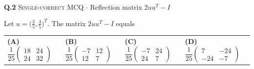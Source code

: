 \documentclass[11pt,a4paper]{article}
\newcommand{\optlabel}[1]{\textbf{(#1)}}
\newcommand{\correctlabel}[1]{\textcolor{okgreen}{\textbf{(#1)}\,\ding{51}}}
\newenvironment{qitem}[1]{\begin{list}{}{\setlength{\leftmargin}{3.3em}\setlength{\labelwidth}{3.1em}%
  \setlength{\labelsep}{0.2em}\setlength{\topsep}{3pt}\setlength{\parsep}{3pt}}\item[\textbf{Q.#1}\hfill]}{\end{list}}
\newcommand{\qmeta}[2]{{\footnotesize\color{black!60}\textsc{#1} \;$\cdot$\; #2}\par}
\begin{document}
\begin{qitem}{2}
\qmeta{Single-correct MCQ}{Reflection matrix $2uu^{T} - I$}
Let $u = \big(\tfrac35, \tfrac45\big)^{T}$. The matrix $2uu^{T} - I$ equals
\par\smallskip\noindent\begin{tabularx}{\linewidth}{@{}*{4}{L}@{}}
\optlabel{A}\,$\dfrac{1}{25}\begin{pmatrix}18 & 24\\ 24 & 32\end{pmatrix}$ & \optlabel{B}\,$\dfrac{1}{25}\begin{pmatrix}-7 & 12\\ 12 & 7\end{pmatrix}$ & \correctlabel{C}\,$\dfrac{1}{25}\begin{pmatrix}-7 & 24\\ 24 & 7\end{pmatrix}$ & \optlabel{D}\,$\dfrac{1}{25}\begin{pmatrix}7 & -24\\ -24 & -7\end{pmatrix}$
\end{tabularx}
\end{qitem}
\end{document}
